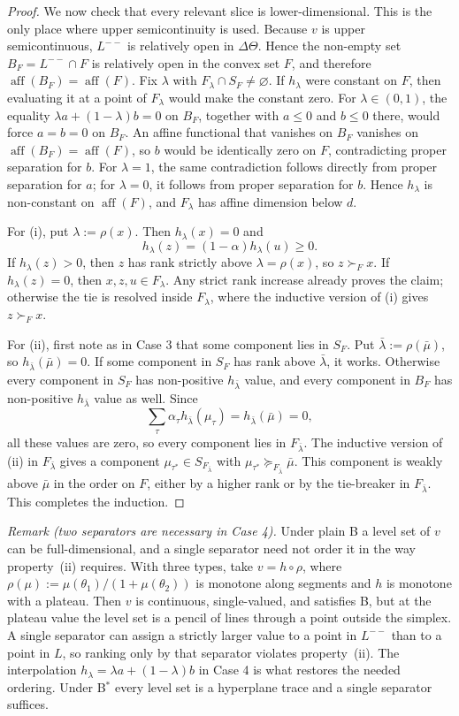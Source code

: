 \documentclass[11pt]{article}
\newcommand{\aff}{\operatorname{aff}}
\begin{document}
\begin{proof}
We now check that every relevant slice is lower-dimensional. This is the only place where upper semicontinuity is used. Because $v$ is upper semicontinuous, $L^{--}$ is relatively open in $\Delta\Theta$. Hence the non-empty set $B_F=L^{--}\cap F$ is relatively open in the convex set $F$, and therefore $\aff(B_F)=\aff(F)$. Fix $\lambda$ with $F_\lambda\cap S_F\neq\varnothing$. If $h_\lambda$ were constant on $F$, then evaluating it at a point of $F_\lambda$ would make the constant zero. For $\lambda\in(0,1)$, the equality $\lambda a+(1-\lambda)b=0$ on $B_F$, together with $a\leq0$ and $b\leq0$ there, would force $a=b=0$ on $B_F$. An affine functional that vanishes on $B_F$ vanishes on $\aff(B_F)=\aff(F)$, so $b$ would be identically zero on $F$, contradicting proper separation for $b$. For $\lambda=1$, the same contradiction follows directly from proper separation for $a$; for $\lambda=0$, it follows from proper separation for $b$. Hence $h_\lambda$ is non-constant on $\aff(F)$, and $F_\lambda$ has affine dimension below $d$.

For (i), put $\lambda:=\rho(x)$. Then $h_\lambda(x)=0$ and
\[
    h_\lambda(z)=(1-\alpha)h_\lambda(u)\geq0.
\]
If $h_\lambda(z)>0$, then $z$ has rank strictly above $\lambda=\rho(x)$, so $z\succ_F x$. If $h_\lambda(z)=0$, then $x,z,u\in F_\lambda$. Any strict rank increase already proves the claim; otherwise the tie is resolved inside $F_\lambda$, where the inductive version of (i) gives $z\succ_F x$.

For (ii), first note as in Case 3 that some component lies in $S_F$. Put $\bar\lambda:=\rho(\bar\mu)$, so $h_{\bar\lambda}(\bar\mu)=0$. If some component in $S_F$ has rank above $\bar\lambda$, it works. Otherwise every component in $S_F$ has non-positive $h_{\bar\lambda}$ value, and every component in $B_F$ has non-positive $h_{\bar\lambda}$ value as well. Since
\[
    \sum_\tau\alpha_\tau h_{\bar\lambda}(\mu_\tau)=h_{\bar\lambda}(\bar\mu)=0,
\]
all these values are zero, so every component lies in $F_{\bar\lambda}$. The inductive version of (ii) in $F_{\bar\lambda}$ gives a component $\mu_{\tau^*}\in S_{F_{\bar\lambda}}$ with $\mu_{\tau^*}\succeq_{F_{\bar\lambda}}\bar\mu$. This component is weakly above $\bar\mu$ in the order on $F$, either by a higher rank or by the tie-breaker in $F_{\bar\lambda}$. This completes the induction.
\end{proof}

\medskip\noindent\emph{Remark (two separators are necessary in Case 4).} Under plain B a level set of $v$ can be full-dimensional, and a single separator need not order it in the way property~(ii) requires. With three types, take $v=h\circ\rho$, where $\rho(\mu):=\mu(\theta_1)/(1+\mu(\theta_2))$ is monotone along segments and $h$ is monotone with a plateau. Then $v$ is continuous, single-valued, and satisfies B, but at the plateau value the level set is a pencil of lines through a point outside the simplex. A single separator can assign a strictly larger value to a point in $L^{--}$ than to a point in $L$, so ranking only by that separator violates property~(ii). The interpolation $h_\lambda=\lambda a+(1-\lambda)b$ in Case 4 is what restores the needed ordering. Under B$^*$ every level set is a hyperplane trace and a single separator suffices.
\end{document}

